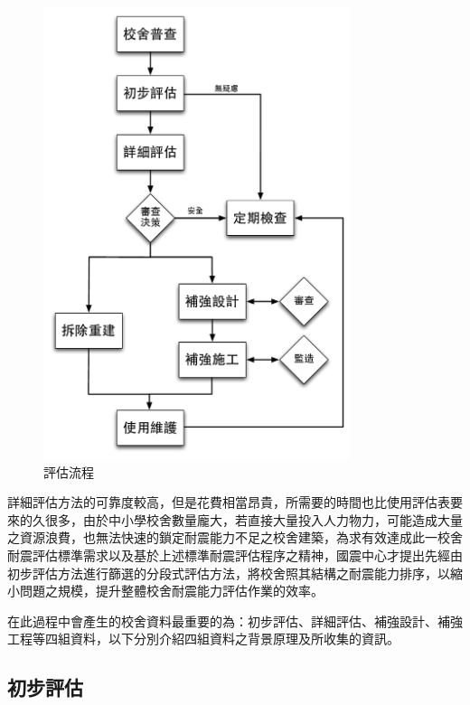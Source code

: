 \begin{figure}[hbtp]
  \begin{center}
    \includegraphics[width=0.8\textwidth]{figures/survey-flow.pdf}
    \caption{評估流程} 
    \label{fig:FLOW}
  \end{center}
\end{figure}

詳細評估方法的可靠度較高，但是花費相當昂貴，所需要的時間也比使用評估表要來的久很多，由於中小學校舍數量龐大，若直接大量投入人力物力，可能造成大量之資源浪費，也無法快速的鎖定耐震能力不足之校舍建築，為求有效達成此一校舍耐震評估標準需求以及基於上述標準耐震評估程序之精神，國震中心才提出先經由初步評估方法進行篩選的分段式評估方法，將校舍照其結構之耐震能力排序，以縮小問題之規模，提升整體校舍耐震能力評估作業的效率。

在此過程中會產生的校舍資料最重要的為：初步評估、詳細評估、補強設計、補強工程等四組資料，以下分別介紹四組資料之背景原理及所收集的資訊。

\subsection{初步評估}

